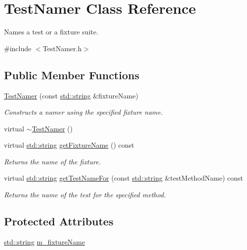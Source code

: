 \hypertarget{class_test_namer}{\section{Test\-Namer Class Reference}
\label{class_test_namer}
}


Names a test or a fixture suite.  




{\ttfamily \#include $<$Test\-Namer.\-h$>$}

\subsection*{Public Member Functions}
\begin{DoxyCompactItemize}
\item 
\hyperlink{class_test_namer_ae2c7e349fae02b71dae8e898946bca9e}{Test\-Namer} (const \hyperlink{glew_8h_ae84541b4f3d8e1ea24ec0f466a8c568b}{std\-::string} \&fixture\-Name)
\begin{DoxyCompactList}\small\item\em Constructs a namer using the specified fixture name. \end{DoxyCompactList}\item 
virtual \hyperlink{class_test_namer_a01312820b0a5d2451940e74aacb09bb1}{$\sim$\-Test\-Namer} ()
\item 
virtual \hyperlink{glew_8h_ae84541b4f3d8e1ea24ec0f466a8c568b}{std\-::string} \hyperlink{class_test_namer_a743cc0b154ff4e32d81feccd97917b62}{get\-Fixture\-Name} () const 
\begin{DoxyCompactList}\small\item\em Returns the name of the fixture. \end{DoxyCompactList}\item 
virtual \hyperlink{glew_8h_ae84541b4f3d8e1ea24ec0f466a8c568b}{std\-::string} \hyperlink{class_test_namer_aa56007426b92b4c34bb2e98548419893}{get\-Test\-Name\-For} (const \hyperlink{glew_8h_ae84541b4f3d8e1ea24ec0f466a8c568b}{std\-::string} \&test\-Method\-Name) const 
\begin{DoxyCompactList}\small\item\em Returns the name of the test for the specified method. \end{DoxyCompactList}\end{DoxyCompactItemize}
\subsection*{Protected Attributes}
\begin{DoxyCompactItemize}
\item 
\hyperlink{glew_8h_ae84541b4f3d8e1ea24ec0f466a8c568b}{std\-::string} \hyperlink{class_test_namer_a02f9b6344602d27ef8095a54846e9307}{m\-\_\-fixture\-Name}
\end{DoxyCompactItemize}


